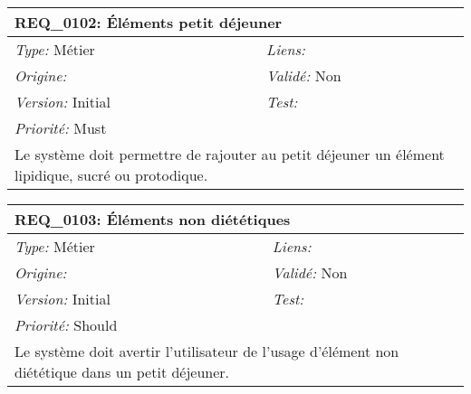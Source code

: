 \begin{table}[!h]

\begin{tabular}{|p{60mm}p{100mm}|}

\hline

\multicolumn{2}{|l|}{\textbf{REQ\_0102:} Éléments petit déjeuner} \\ \hline

\emph{Type:} Métier & \emph{Liens:}  \\

\emph{Origine:}  & \emph{Validé:} Non \\

\emph{Version:} Initial & \emph{Test:}  \\

\emph{Priorité:} Must & \\ \hline

\multicolumn{2}{|p{16cm}|}{Le système doit permettre de rajouter au petit déjeuner un élément lipidique, sucré ou protodique.} \\ \hline

\end{tabular}

\end{table}



\begin{table}[!h]

\begin{tabular}{|p{60mm}p{100mm}|}

\hline

\multicolumn{2}{|l|}{\textbf{REQ\_0103:} Éléments non diététiques} \\ \hline

\emph{Type:} Métier & \emph{Liens:}  \\

\emph{Origine:}  & \emph{Validé:} Non \\

\emph{Version:} Initial & \emph{Test:}  \\

\emph{Priorité:} Should & \\ \hline

\multicolumn{2}{|p{16cm}|}{Le système doit avertir l'utilisateur de l'usage d'élément non diététique dans un petit déjeuner.} \\ \hline

\end{tabular}

\end{table}



